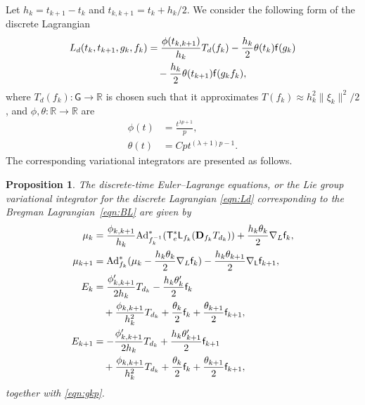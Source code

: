 \documentclass[letterpaper, 10pt, conference]{ieeeconf}
\newcommand{\G}{\ensuremath{\mathsf{G}}}
\newcommand{\T}{\ensuremath{\mathsf{T}}}
\renewcommand{\L}{\ensuremath{\mathsf{L}}}
\renewcommand{\Re}{\ensuremath{\mathbb{R}}}
\newcommand{\D}{\ensuremath{\mathbf{D}}}
\newcommand{\Ad}{\ensuremath{\mathrm{Ad}}}
\newtheorem{prop}{Proposition}
\begin{document}
Let $h_k = t_{k+1}- t_k$ and $t_{k,k+1} = t_k + h_k/2$.  
We consider the following form of the discrete Lagrangian
\begin{align}
    L_d(t_k, t_{k+1}, g_k, f_k ) & = \frac{\phi(t_{k,k+1}) }{h_k} T_d(f_k) -\frac{h_k}{2} \theta(t_k) \mathsf{f} (g_k)\nonumber \\
                                 & \quad -\frac{h_k}{2} \theta(t_{k+1}) \mathsf{f} (g_kf_k), \label{eqn:Ld}
\end{align}
where $T_d(f_k):\G\rightarrow\Re$ is chosen such that it approximates $T(f_k) \approx h_k^2 \|\xi_k \|^2/2$, and $\phi,\theta:\Re\rightarrow\Re$ are 
\begin{align}
    \phi(t) & = \frac{t^{\lambda p +1}}{p},\\
    \theta(t) & = C p t^{(\lambda+1)p-1}.
\end{align}
The corresponding variational integrators are presented as follows.
\begin{prop}\label{prop:DEL_Breg}
    The discrete-time Euler--Lagrange equations, or the Lie group variational integrator for the discrete Lagrangian \eqref{eqn:Ld} corresponding to the Bregman Lagrangian~\eqref{eqn:BL} are given by
\begin{align}
    \mu_k & =  \frac{\phi_{k,k+1}}{h_k}\Ad^*_{f_k^{-1}} (\T^*_e\L_{f_k}(\D_{f_k} T_{d_k})) + \frac{h_k\theta_k}{2} \nabla_L \obj_k, \label{eqn:muk_Breg}\\
    \mu_{k+1} & = \Ad^*_{f_k}( \mu_k - \frac{h_k\theta_k}{2} \nabla_L\obj_k ) -\frac{h_k\theta_{k+1}}{2} \nabla_\L \obj_{k+1}, \label{eqn:mukp_Breg}\\
    E_{k} & = \frac{\phi'_{k,k+1}}{ 2 h_k} T_{d_k} -\frac{h_k\theta'_{k}}{2} \obj_{k} \nonumber\\\
          & \quad + \frac{\phi_{k,k+1}}{h_k^2}T_{d_k} + \frac{\theta_k}{2}\obj_k + \frac{\theta_{k+1}}{2}\obj_{k+1}, \label{eqn:Ek_Breg}\\
    E_{k+1} & = -\frac{\phi'_{k,k+1}}{ 2 h_k} T_{d_k} +\frac{h_k\theta'_{k+1}}{2} \obj_{k+1}\nonumber \\\
            & \quad + \frac{\phi_{k,k+1}}{h_k^2}T_{d_k} +\frac{\theta_k}{2}\obj_k + \frac{\theta_{k+1}}{2}\obj_{k+1}, \label{eqn:Ekp_Breg}
\end{align}
together with \eqref{eqn:gkp}.
\end{prop}
\end{document}
